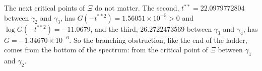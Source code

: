 The next critical points of $\Xi$ do not matter. The second, $t^{**}=22.0979772804$ between $\gamma_2$ and $\gamma_3$, has $G(-t^{**2})=1.56051\times10^{-5}>0$ and $\log G(-t^{**2})=-11.0679$, and the third, $26.2722473569$ between $\gamma_3$ and $\gamma_4$, has $G=-1.34670\times10^{-6}$. So the branching obstruction, like the end of the ladder, comes from the bottom of the spectrum: from the critical point of $\Xi$ between $\gamma_1$ and $\gamma_2$.
